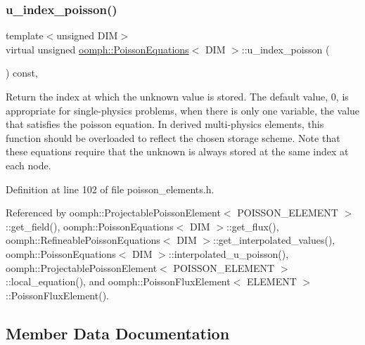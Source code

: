 \subsubsection{\texorpdfstring{u\+\_\+index\+\_\+poisson()}{u\_index\_poisson()}}
{\footnotesize\ttfamily template$<$unsigned D\+IM$>$ \\
virtual unsigned \hyperlink{classoomph_1_1PoissonEquations}{oomph\+::\+Poisson\+Equations}$<$ D\+IM $>$\+::u\+\_\+index\+\_\+poisson (\begin{DoxyParamCaption}{ }\end{DoxyParamCaption}) const\hspace{0.3cm}{\ttfamily [inline]}, {\ttfamily [virtual]}}



Return the index at which the unknown value is stored. The default value, 0, is appropriate for single-\/physics problems, when there is only one variable, the value that satisfies the poisson equation. In derived multi-\/physics elements, this function should be overloaded to reflect the chosen storage scheme. Note that these equations require that the unknown is always stored at the same index at each node. 



Definition at line 102 of file poisson\+\_\+elements.\+h.



Referenced by oomph\+::\+Projectable\+Poisson\+Element$<$ P\+O\+I\+S\+S\+O\+N\+\_\+\+E\+L\+E\+M\+E\+N\+T $>$\+::get\+\_\+field(), oomph\+::\+Poisson\+Equations$<$ D\+I\+M $>$\+::get\+\_\+flux(), oomph\+::\+Refineable\+Poisson\+Equations$<$ D\+I\+M $>$\+::get\+\_\+interpolated\+\_\+values(), oomph\+::\+Poisson\+Equations$<$ D\+I\+M $>$\+::interpolated\+\_\+u\+\_\+poisson(), oomph\+::\+Projectable\+Poisson\+Element$<$ P\+O\+I\+S\+S\+O\+N\+\_\+\+E\+L\+E\+M\+E\+N\+T $>$\+::local\+\_\+equation(), and oomph\+::\+Poisson\+Flux\+Element$<$ E\+L\+E\+M\+E\+N\+T $>$\+::\+Poisson\+Flux\+Element().



\subsection{Member Data Documentation}
\mbox{\label{classoomph_1_1PoissonEquations_a53bef5cd00f9f0e0c352bc1383c29ec7}} 
